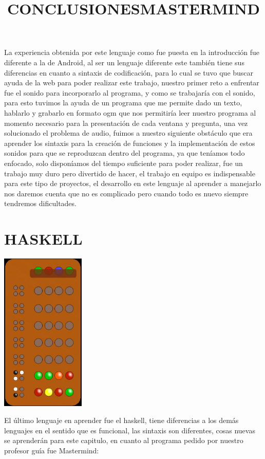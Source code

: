 \documentclass[12pt]{extbook}
\begin{document}
\begin{center}
\title{CONCLUSIONES}\maketitle
\end{center}

La experiencia obtenida por este lenguaje como fue puesta en la introducción
fue diferente a la de Android, al ser un lenguaje diferente este también
tiene sus diferencias en cuanto a sintaxis de codificación, para lo
cual se tuvo que buscar ayuda de la web para poder realizar este trabajo,
nuestro primer reto a enfrentar fue el sonido para incorporarlo al
programa, y como se trabajaría con el sonido, para esto tuvimos la
ayuda de un programa que me permite dado un texto, hablarlo y grabarlo
en formato ogm que nos permitiría leer nuestro programa al momento
necesario para la presentación de cada ventana y pregunta, una vez
solucionado el problema de audio, fuimos a nuestro siguiente obstáculo
que era aprender los sintaxis para la creación de funciones y la implementación
de estos sonidos para que se reproduzcan dentro del programa, ya que
teníamos todo enfocado, solo disponíamos del tiempo suficiente para
poder realizar, fue un trabajo muy duro pero divertido de hacer, el
trabajo en equipo es indispensable para este tipo de proyectos, el
desarrollo en este lenguaje al aprender a manejarlo nos daremos cuenta
que no es complicado pero cuando todo es nuevo siempre tendremos dificultades.

\chapter{HASKELL}
\begin{center}
\title{\Large{MASTERMIND}}\maketitle
\end{center}

\begin{center}
\includegraphics[width=4cm]{mastermind.jpg}
\end{center}
El último lenguaje en aprender fue el haskell, tiene diferencias a
los demás lenguajes en el sentido que es funcional, las sintaxis son
diferentes, cosas nuevas se aprenderán para este capitulo, en cuanto
al programa pedido por nuestro profesor guía fue Mastermind: \\
\end{document}
